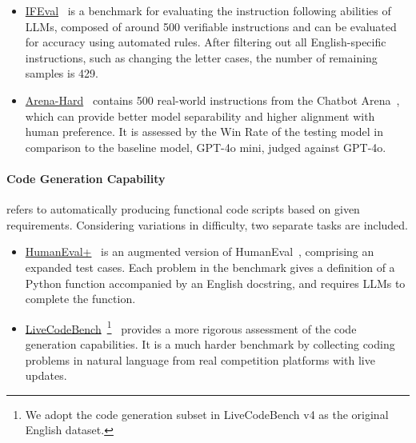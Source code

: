 \begin{itemize}[nosep,itemsep=1pt,leftmargin=0.1cm]
    \item \underline{IFEval}~\cite{zhou2023instruction} is a benchmark for evaluating the instruction following abilities of LLMs, composed of around 500 verifiable instructions and can be evaluated for accuracy using automated rules. After filtering out all English-specific instructions, such as changing the letter cases, the number of remaining samples is 429.
    \item \underline{Arena-Hard}~\cite{li2024crowdsourced} contains 500 real-world instructions from the Chatbot Arena~\cite{chiang2024chatbot}, which can provide better model separability and higher alignment with human preference. It is assessed by the Win Rate of the testing model in comparison to the baseline model, GPT-4o mini, judged against GPT-4o.
\end{itemize}


\paragraph{Code Generation Capability} refers to automatically producing functional code scripts based on given requirements. Considering variations in difficulty, two separate tasks are included. 
\begin{itemize}[nosep,itemsep=1pt,leftmargin=0.1cm]
    \item \underline{HumanEval+}~\cite{liu2024your} is an augmented version of HumanEval~\cite{chen2021evaluating}, comprising an expanded test cases. Each problem in the benchmark gives a definition of a Python function accompanied by an English docstring, and requires LLMs to complete the function.
    \item \underline{LiveCodeBench}~\footnote{We adopt the code generation subset in LiveCodeBench v4 as the original English dataset.}~\cite{jain2024livecodebench} provides a more rigorous assessment of the code generation capabilities. It is a much harder benchmark by collecting coding problems in natural language from real competition platforms with live updates.
\end{itemize}


